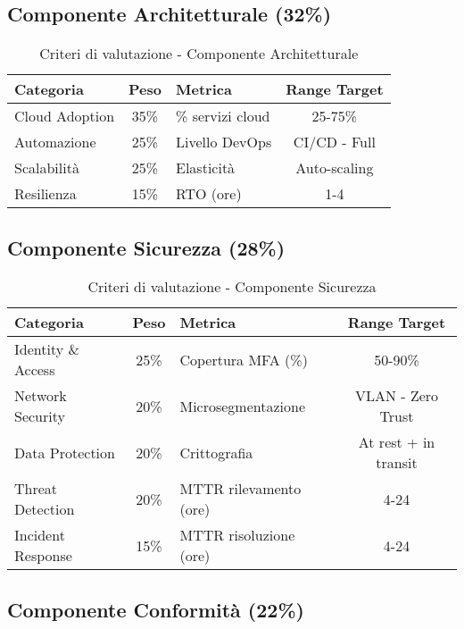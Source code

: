 \subsection{Componente Architetturale (32\%)}

\begin{table}[H]
\centering
\caption{Criteri di valutazione - Componente Architetturale}
\small
\begin{tabular}{l c l c}
\toprule
\textbf{Categoria} & \textbf{Peso} & \textbf{Metrica} & \textbf{Range Target} \\
\midrule
Cloud Adoption & 35\% & \% servizi cloud & 25-75\% \\
Automazione & 25\% & Livello DevOps & CI/CD - Full \\
Scalabilità & 25\% & Elasticità & Auto-scaling \\
Resilienza & 15\% & RTO (ore) & 1-4 \\
\bottomrule
\end{tabular}
\end{table}

\subsection{Componente Sicurezza (28\%)}

\begin{table}[H]
\centering
\caption{Criteri di valutazione - Componente Sicurezza}
\small
\begin{tabular}{l c l c}
\toprule
\textbf{Categoria} & \textbf{Peso} & \textbf{Metrica} & \textbf{Range Target} \\
\midrule
Identity \& Access & 25\% & Copertura MFA (\%) & 50-90\% \\
Network Security & 20\% & Microsegmentazione & VLAN - Zero Trust \\
Data Protection & 20\% & Crittografia & At rest + in transit \\
Threat Detection & 20\% & MTTR rilevamento (ore) & 4-24 \\
Incident Response & 15\% & MTTR risoluzione (ore) & 4-24 \\
\bottomrule
\end{tabular}
\end{table}

\subsection{Componente Conformità (22\%)}

